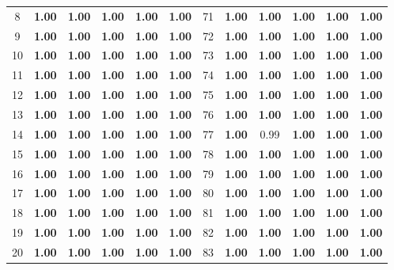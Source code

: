 \documentclass{article}
\begin{document}
{\begin{longtable}{cccccc@{\qquad}cccccc}
8 & \textbf{1.00} & \textbf{1.00} & \textbf{1.00} & \textbf{1.00} & \textbf{1.00} & 71 & \textbf{1.00} & \textbf{1.00} & \textbf{1.00} & \textbf{1.00} & \textbf{1.00} \\
9 & \textbf{1.00} & \textbf{1.00} & \textbf{1.00} & \textbf{1.00} & \textbf{1.00} & 72 & \textbf{1.00} & \textbf{1.00} & \textbf{1.00} & \textbf{1.00} & \textbf{1.00} \\
10 & \textbf{1.00} & \textbf{1.00} & \textbf{1.00} & \textbf{1.00} & \textbf{1.00} & 73 & \textbf{1.00} & \textbf{1.00} & \textbf{1.00} & \textbf{1.00} & \textbf{1.00} \\
11 & \textbf{1.00} & \textbf{1.00} & \textbf{1.00} & \textbf{1.00} & \textbf{1.00} & 74 & \textbf{1.00} & \textbf{1.00} & \textbf{1.00} & \textbf{1.00} & \textbf{1.00} \\
12 & \textbf{1.00} & \textbf{1.00} & \textbf{1.00} & \textbf{1.00} & \textbf{1.00} & 75 & \textbf{1.00} & \textbf{1.00} & \textbf{1.00} & \textbf{1.00} & \textbf{1.00} \\
13 & \textbf{1.00} & \textbf{1.00} & \textbf{1.00} & \textbf{1.00} & \textbf{1.00} & 76 & \textbf{1.00} & \textbf{1.00} & \textbf{1.00} & \textbf{1.00} & \textbf{1.00} \\
14 & \textbf{1.00} & \textbf{1.00} & \textbf{1.00} & \textbf{1.00} & \textbf{1.00} & 77 & \textbf{1.00} & 0.99 & \textbf{1.00} & \textbf{1.00} & \textbf{1.00} \\
15 & \textbf{1.00} & \textbf{1.00} & \textbf{1.00} & \textbf{1.00} & \textbf{1.00} & 78 & \textbf{1.00} & \textbf{1.00} & \textbf{1.00} & \textbf{1.00} & \textbf{1.00} \\
16 & \textbf{1.00} & \textbf{1.00} & \textbf{1.00} & \textbf{1.00} & \textbf{1.00} & 79 & \textbf{1.00} & \textbf{1.00} & \textbf{1.00} & \textbf{1.00} & \textbf{1.00} \\
17 & \textbf{1.00} & \textbf{1.00} & \textbf{1.00} & \textbf{1.00} & \textbf{1.00} & 80 & \textbf{1.00} & \textbf{1.00} & \textbf{1.00} & \textbf{1.00} & \textbf{1.00} \\
18 & \textbf{1.00} & \textbf{1.00} & \textbf{1.00} & \textbf{1.00} & \textbf{1.00} & 81 & \textbf{1.00} & \textbf{1.00} & \textbf{1.00} & \textbf{1.00} & \textbf{1.00} \\
19 & \textbf{1.00} & \textbf{1.00} & \textbf{1.00} & \textbf{1.00} & \textbf{1.00} & 82 & \textbf{1.00} & \textbf{1.00} & \textbf{1.00} & \textbf{1.00} & \textbf{1.00} \\
20 & \textbf{1.00} & \textbf{1.00} & \textbf{1.00} & \textbf{1.00} & \textbf{1.00} & 83 & \textbf{1.00} & \textbf{1.00} & \textbf{1.00} & \textbf{1.00} & \textbf{1.00} \\

\end{longtable}}
\end{document}
